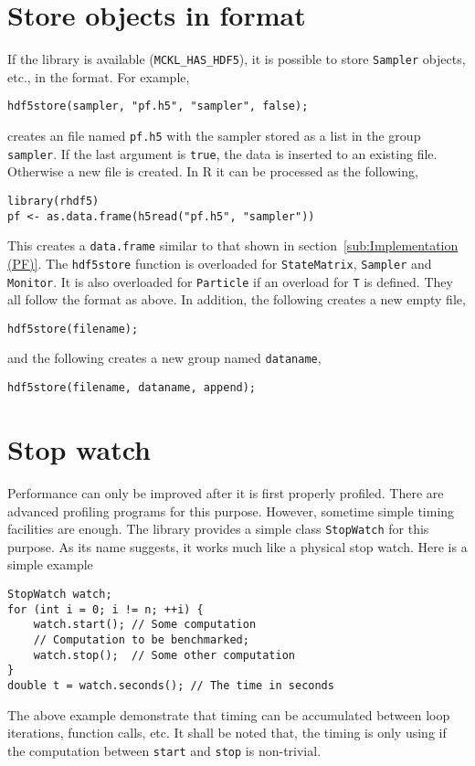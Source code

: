 \section{Store objects in \texorpdfstring{\protect{}}{HDF5} format}
\label{sec:Store objects in HDF5 format}

If the \hdf library is available (\verb|MCKL_HAS_HDF5|), it is possible to
store \verb|Sampler| objects, etc., in the \hdf format. For example,
\begin{Verbatim}
hdf5store(sampler, "pf.h5", "sampler", false);
\end{Verbatim}
creates an \hdf file named \verb|pf.h5| with the sampler stored as a list in
the group \verb|sampler|. If the last argument is \verb|true|, the data is
inserted to an existing file. Otherwise a new file is created. In R it can be
processed as the following,
\begin{Verbatim}
library(rhdf5)
pf <- as.data.frame(h5read("pf.h5", "sampler"))
\end{Verbatim}
This creates a \verb|data.frame| similar to that shown in
section~\ref{sub:Implementation (PF)}. The \verb|hdf5store| function is
overloaded for \verb|StateMatrix|, \verb|Sampler| and \verb|Monitor|. It is
also overloaded for \verb|Particle| if an overload for \verb|T| is defined.
They all follow the format as above. In addition, the following creates a new
empty \hdf file,
\begin{Verbatim}
hdf5store(filename);
\end{Verbatim}
and the following creates a new group named \verb|dataname|,
\begin{Verbatim}
hdf5store(filename, dataname, append);
\end{Verbatim}

\section{Stop watch}
\label{sec:Stop watch}

Performance can only be improved after it is first properly profiled. There are
advanced profiling programs for this purpose. However, sometime simple timing
facilities are enough. The library provides a simple class \verb|StopWatch| for
this purpose. As its name suggests, it works much like a physical stop watch.
Here is a simple example
\begin{Verbatim}
StopWatch watch;
for (int i = 0; i != n; ++i) {
    watch.start(); // Some computation
    // Computation to be benchmarked;
    watch.stop();  // Some other computation
}
double t = watch.seconds(); // The time in seconds
\end{Verbatim}
The above example demonstrate that timing can be accumulated between loop
iterations, function calls, etc. It shall be noted that, the timing is only
using if the computation between \verb|start| and \verb|stop| is non-trivial.
